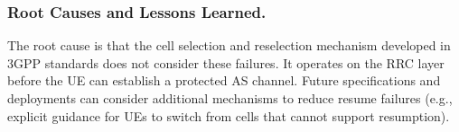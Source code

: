 \subsubsection{Root Causes and Lessons Learned.} The root cause is that the cell selection and reselection mechanism developed in 3GPP standards does not consider these failures. It operates on the RRC layer before the UE can establish a protected AS channel. Future specifications and deployments can consider additional mechanisms to reduce resume failures (e.g., explicit guidance for UEs to switch from cells that cannot support resumption). 


